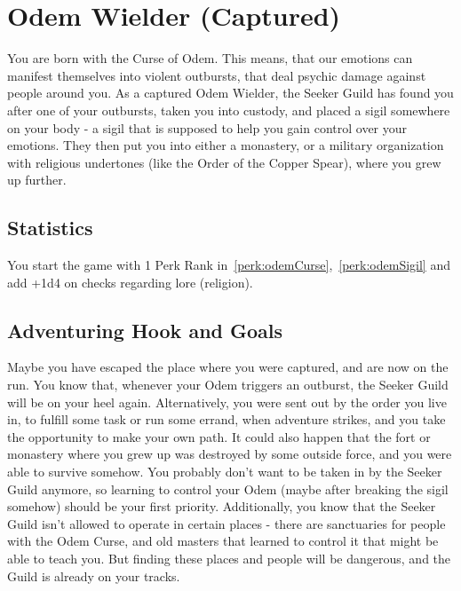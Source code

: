 \section{Odem Wielder (Captured)}\label{background:odemWielderCaptured}
You are born with the Curse of Odem.
This means, that our emotions can manifest themselves into violent outbursts, that deal psychic damage against people around you.
As a captured Odem Wielder, the Seeker Guild has found you after one of your outbursts, taken you into custody, and placed a sigil somewhere on your body - a sigil that is supposed to help you gain control over your emotions.
They then put you into either a monastery, or a military organization with religious undertones (like the Order of the Copper Spear), where you grew up further.

\subsection{Statistics}
You start the game with 1 Perk Rank in~\ref{perk:odemCurse},~\ref{perk:odemSigil} and add +1d4 on checks regarding lore (religion).

\subsection{Adventuring Hook and Goals}
Maybe you have escaped the place where you were captured, and are now on the run.
You know that, whenever your Odem triggers an outburst, the Seeker Guild will be on your heel again.
Alternatively, you were sent out by the order you live in, to fulfill some task or run some errand, when adventure strikes, and you take the opportunity to make your own path.
It could also happen that the fort or monastery where you grew up was destroyed by some outside force, and you were able to survive somehow.
You probably don't want to be taken in by the Seeker Guild anymore, so learning to control your Odem (maybe after breaking the sigil somehow) should be your first priority.
Additionally, you know that the Seeker Guild isn't allowed to operate in certain places - there are sanctuaries for people with the Odem Curse, and old masters that learned to control it that might be able to teach you.
But finding these places and people will be dangerous, and the Guild is already on your tracks.